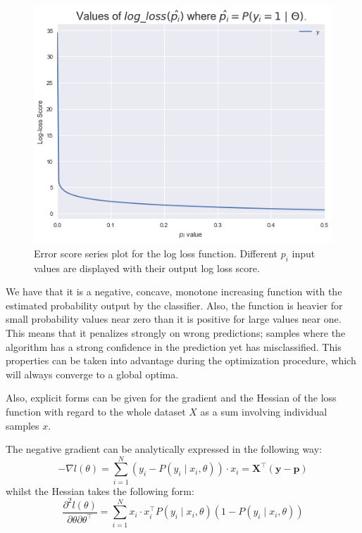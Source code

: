 \begin{figure}[h!]
\begin{center}
\includegraphics[width=0.7\columnwidth]{figures/logloss/figure-logLossValues.png}
\caption{ Error score series plot for the log loss function.
Different $p_i$ input values are displayed with their output log loss score.}
\label{figure-logLossValues}
\end{center}
\end{figure}

We have that it is a negative, concave, monotone increasing function with the estimated probability output by the classifier.
Also, the function is heavier for small probability values near zero than it is positive for large values near one.
This means that it penalizes strongly on wrong predictions; samples where the algorithm has a strong confidence in the prediction yet has misclassified.
This properties can be taken into advantage during the optimization procedure, which will always converge to a global optima.

Also, explicit forms can be given for the gradient and the Hessian of the loss function with regard to the whole dataset $X$ as a sum involving individual samples $x$.

The negative gradient can be analytically expressed in the following way: %
\begin{equation}
- \nabla l(\theta) = \sum_{i=1}^N (y_i - P(y_i \mid x_i,\theta))\cdot x_i = \textbf{X}^{\intercal}(\textbf{y}-\textbf{p})
\label{eq:logitHessian1}
\end{equation}
whilst the Hessian takes the following form:
\begin{equation}
\frac{\partial^2 l(\theta)}{\partial \theta \partial \theta^\intercal} = \sum_{i=1}^N x_i \cdot x_i^\intercal P(y_i \mid x_i,\theta)(1 -P(y_i \mid x_i,\theta))
\label{eq:logitHessian2}
\end{equation}

